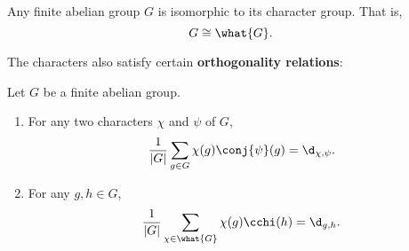     \begin{proposition}\label{prop:character_group_isomorphim}
      Any finite abelian group $G$ is isomorphic to its character group. That is,
      \[
        G \cong \what{G}.
      \]
    \end{proposition}

    The characters also satisfy certain \textbf{orthogonality relations}:

    \begin{proposition}
      Let $G$ be a finite abelian group.
      \begin{enumerate}[label=(\roman*)]
        \item For any two characters $\chi$ and $\psi$ of $G$,
        \[
          \frac{1}{|G|}\sum_{g \in G}\chi(g)\conj{\psi}(g) = \d_{\chi,\psi}.
        \]
        \item For any $g,h \in G$,
        \[
          \frac{1}{|G|}\sum_{\chi \in \what{G}}\chi(g)\cchi(h) = \d_{g,h}.
        \]
      \end{enumerate}
    \end{proposition}
